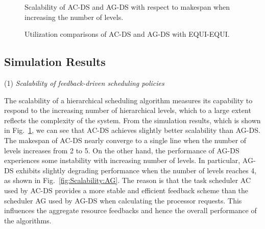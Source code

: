 \documentclass[10pt, a4paper]{article}
\newcommand{\figref}[1]         {Fig.~\ref{fig:#1}}
\begin{document}
\begin{figure}[t]
\centering
    \caption{Scalability of AC-DS and AG-DS with respect to makespan when increasing the number of levels.}
    \label{fig:Scalability}
\end{figure}
\begin{figure}[t]
\centering

    \caption{Utilization comparisons of AC-DS and AG-DS with EQUI-EQUI.}
    \label{fig:Utilization}
\end{figure}

\subsection{Simulation Results}

\indent\indent(1) \emph{Scalability of feedback-driven scheduling policies}

The scalability of a hierarchical scheduling algorithm measures its capability to respond to the
increasing number of hierarchical levels, which to a large extent reflects the complexity of the
system. From the simulation results, which is shown in \figref{Scalability}, we can see that AC-DS
achieves slightly better scalability than AG-DS. The makespan of AC-DS nearly converge to a single
line when the number of levels increases from 2 to 5. On the other hand, the performance of AG-DS
experiences some instability with increasing number of levels. In particular, AG-DS exhibits
slightly degrading performance when the number of levels reaches 4, as shown in
\figref{Scalability:AG}. The reason is that the task scheduler AC used by AC-DS provides a more
stable and efficient feedback scheme than the scheduler AG used by AG-DS when calculating the
processor requests. This influences the aggregate resource feedbacks and hence the overall
performance of the algorithms.
\end{document}
